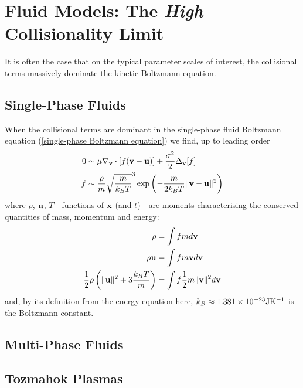 \section{Fluid Models: The \emph{High} Collisionality Limit}
    It is often the case that on the typical parameter scales of interest, the collisional terms massively dominate the kinetic Boltzmann equation. 
    
    \subsection{Single-Phase Fluids}
        When the collisional terms are dominant in the single-phase fluid Boltzmann equation (\ref{single-phase Boltzmann equation}) we find, up to leading order
        \begin{align}
            0  &\sim  \mu\nabla_{\mathbf{v}}\cdot[f(\mathbf{v} - \mathbf{u})] + \frac{\sigma^{2}}{2}\Delta_{\mathbf{v}}[f]  \\
            f  &\sim  \frac{\rho}{m}\sqrt{\frac{m}{k_{B}T}}^{3}\exp\left(- \frac{m}{2k_{B}T}\|\mathbf{v} - \mathbf{u}\|^{2}\right)
        \end{align}
        where $\rho$, $\mathbf{u}$, $T$—functions of $\mathbf{x}$ (and $t$)—are moments characterising the conserved quantities of mass, momentum and energy:
        \begin{align}
            \rho  &=  \int fmd\mathbf{v}  \\
            \rho\mathbf{u}  &=  \int fm\mathbf{v} d\mathbf{v}  \\
            \frac{1}{2}\rho\left(\|\mathbf{u}\|^{2} + 3\frac{k_{B}T}{m}\right)  &=  \int f\frac{1}{2}m\|\mathbf{v}\|^{2}d\mathbf{v}
        \end{align}
        and, by its definition from the energy equation here,  $k_{B}  \approx  1.381\times10^{- 23}\mathrm{J}\mathrm{K}^{- 1}$ is the Boltzmann constant.
    
    \subsection{Multi-Phase Fluids}
    \subsection{Tozmahok Plasmas}